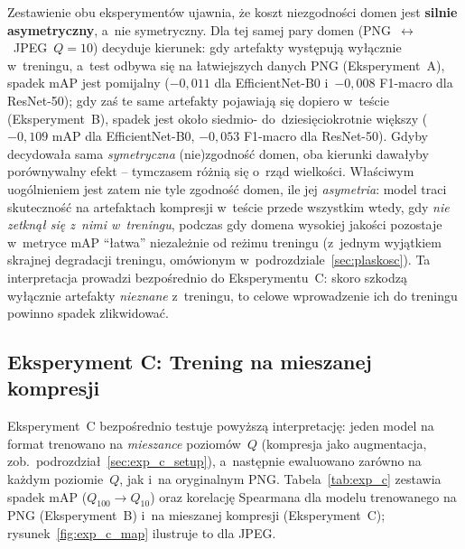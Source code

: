 \documentclass[12pt,a4paper]{article}
\begin{document}
Zestawienie obu eksperymentów ujawnia, że koszt niezgodności domen jest \textbf{silnie asymetryczny}, a~nie symetryczny. Dla tej samej pary domen (PNG~$\leftrightarrow$~JPEG~$Q=10$) decyduje kierunek: gdy artefakty występują wyłącznie w~treningu, a~test odbywa się na łatwiejszych danych PNG (Eksperyment~A), spadek mAP jest pomijalny ($-0{,}011$ dla EfficientNet-B0 i~$-0{,}008$ F1-macro dla ResNet-50); gdy zaś te same artefakty pojawiają się dopiero w~teście (Eksperyment~B), spadek jest około siedmio- do~dziesięciokrotnie większy ($-0{,}109$ mAP dla EfficientNet-B0, $-0{,}053$ F1-macro dla ResNet-50). Gdyby decydowała sama \emph{symetryczna} (nie)zgodność domen, oba kierunki dawałyby porównywalny efekt -- tymczasem różnią się o~rząd wielkości. Właściwym uogólnieniem jest zatem nie tyle zgodność domen, ile jej \emph{asymetria}: model traci skuteczność na artefaktach kompresji w~teście przede wszystkim wtedy, gdy \emph{nie zetknął się z~nimi w~treningu}, podczas gdy domena wysokiej jakości pozostaje w~metryce mAP \enquote{łatwa} niezależnie od reżimu treningu (z~jednym wyjątkiem skrajnej degradacji treningu, omówionym w~podrozdziale~\ref{sec:plaskosc}). Ta interpretacja prowadzi bezpośrednio do Eksperymentu~C: skoro szkodzą wyłącznie artefakty \emph{nieznane} z~treningu, to celowe wprowadzenie ich do treningu powinno spadek zlikwidować.

\subsection{Eksperyment C: Trening na mieszanej kompresji}
\label{sec:wyniki_c}

Eksperyment~C bezpośrednio testuje powyższą interpretację: jeden model na format trenowano na \emph{mieszance} poziomów~$Q$ (kompresja jako augmentacja, zob.~podrozdział~\ref{sec:exp_c_setup}), a~następnie ewaluowano zarówno na każdym poziomie~$Q$, jak i~na oryginalnym PNG. Tabela~\ref{tab:exp_c} zestawia spadek mAP ($Q_{100}\!\to\!Q_{10}$) oraz korelację Spearmana dla modelu trenowanego na PNG (Eksperyment~B) i~na mieszanej kompresji (Eksperyment~C); rysunek~\ref{fig:exp_c_map} ilustruje to dla JPEG.
\end{document}
